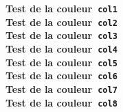 \documentclass{article}
\newcommand{\ttt}{Test de la couleur~}
\begin{document}
{\bf \Large
\noindent
\textcolor{col1}{\ttt \texttt{col1}} \\
\textcolor{col2}{\ttt \texttt{col2}} \\
\textcolor{col3}{\ttt \texttt{col3}} \\
\textcolor{col4}{\ttt \texttt{col4}} \\
\textcolor{col5}{\ttt \texttt{col5}} \\
\textcolor{col6}{\ttt \texttt{col6}} \\
\textcolor{col7}{\ttt \texttt{col7}} \\
\textcolor{col8}{\ttt \texttt{col8}} 
}
\end{document}
